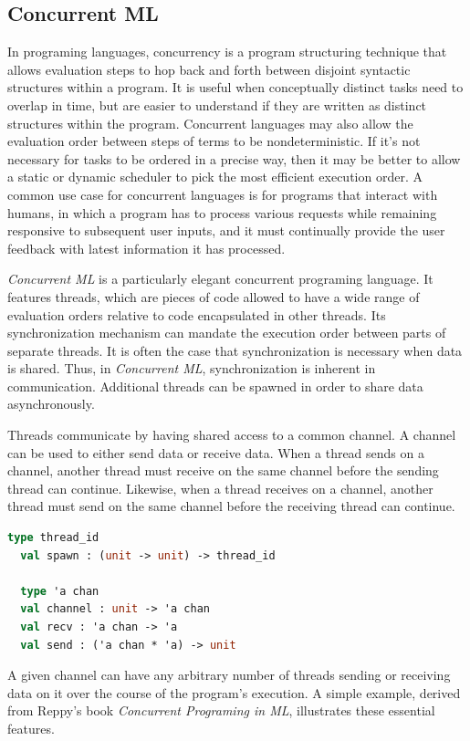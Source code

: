 \documentclass[letterpaper, 11pt]{extarticle}
\begin{document}
\subsection{Concurrent ML}
In programing languages, concurrency is a program structuring technique that allows evaluation
steps to hop back and forth between disjoint syntactic structures within a program.
It is useful
when conceptually distinct tasks need to overlap in time, but are easier to understand if they
are written as distinct structures within the program. Concurrent languages may also allow the
evaluation order between steps of terms to be nondeterministic. If it's not necessary for
tasks to be ordered in a precise way, then it may be better to allow a static or dynamic
scheduler to pick the most efficient execution order. A common use case for concurrent languages
is for programs that interact with humans, in which a program has to process various requests
while remaining responsive to subsequent user inputs, and it must continually provide the user
feedback with latest information it has processed.

\textit{Concurrent ML} is a particularly elegant concurrent programing language.
It features threads, which are pieces of code allowed to have a wide range of
evaluation orders relative to code encapsulated in other threads. Its synchronization
mechanism can mandate the execution order between parts of separate threads. It is often the
case that synchronization is necessary when data is shared. Thus, in \textit{Concurrent ML},
synchronization is inherent in communication. Additional threads can be spawned
in order to share data asynchronously.

Threads communicate by having shared access to a common channel. A channel can be used to
either send data or receive data.  When a thread sends on a channel, another thread must
receive on the same channel before the sending thread can continue.  Likewise, when a thread
receives on a channel, another thread must send on the same channel before the receiving thread
can continue.

\begin{lstlisting}[language=ML]
  type thread_id
  val spawn : (unit -> unit) -> thread_id

  type 'a chan
  val channel : unit -> 'a chan
  val recv : 'a chan -> 'a
  val send : ('a chan * 'a) -> unit
  \end{lstlisting}

A given channel can have any arbitrary number of threads sending or receiving data on it over
the course of the program's execution. A simple example, derived from Reppy's book
\textit{Concurrent Programing in ML}, illustrates these essential
features.
\end{document}
